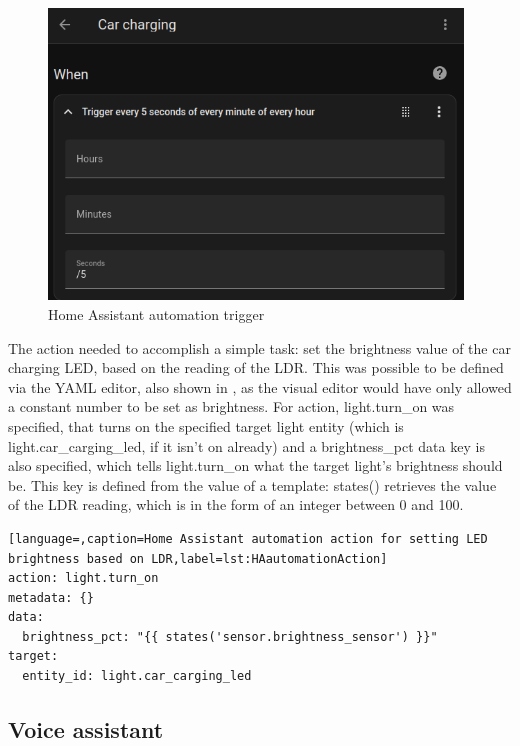 \begin{figure}[!ht]
  \centering
  \includegraphics[width=110mm, keepaspectratio]{figures/homeassistant_automation_trigger.png}
  \caption{Home Assistant automation trigger}
  \label{fig:HAautomationTrigger}
\end{figure}

The action needed to accomplish a simple task: set the brightness value of the car charging LED, based on the reading of the LDR. This was possible to be defined via the YAML editor, also shown in , as the visual editor would have only allowed a constant number to be set as brightness. For action, light.turn\_on was specified, that turns on the specified target light entity (which is light.car\_carging\_led, if it isn't on already) and a brightness\_pct data key is also specified, which tells light.turn\_on what the target light's brightness should be. This key is defined from the value of a template: states() retrieves the value of the LDR reading, which is in the form of an integer between 0 and 100.%

\begin{lstlisting}[language=,caption=Home Assistant automation action for setting LED brightness based on LDR,label=lst:HAautomationAction]
action: light.turn_on
metadata: {}
data:
  brightness_pct: "{{ states('sensor.brightness_sensor') }}"
target:
  entity_id: light.car_carging_led  
\end{lstlisting}

\subsection{Voice assistant}


